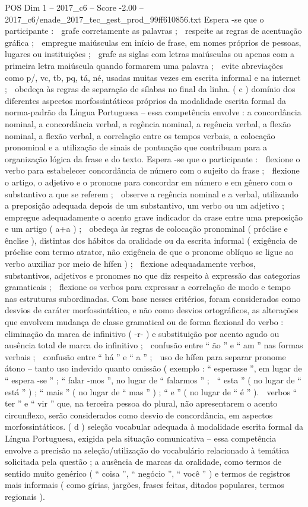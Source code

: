 \begin{textsample}{POS Dim 1 – 2017\_c6 – Score -2.00 – 2017\_c6/enade\_2017\_tec\_gest\_prod\_99ff610856.txt}
Espera -se que o participante :  grafe corretamente as palavras ;  respeite as regras de acentuação gráfica ;  empregue maiúsculas em início de frase, em nomes próprios de pessoas, lugares ou instituições ;  grafe as siglas com letras maiúsculas ou apenas com a primeira letra maiúscula quando formarem uma palavra ;  evite abreviações como p/, vc, tb, pq, tá, né, usadas muitas vezes em escrita informal e na internet ;  obedeça às regras de separação de sílabas no final da linha. ( c ) domínio dos diferentes aspectos morfossintáticos próprios da modalidade escrita formal da norma-padrão da Língua Portuguesa – essa competência envolve : a concordância nominal, a concordância verbal, a regência nominal, a regência verbal, a flexão nominal, a flexão verbal, a correlação entre os tempos verbais, a colocação pronominal e a utilização de sinais de pontuação que contribuam para a organização lógica da frase e do texto.
Espera -se que o participante :  flexione o verbo para estabelecer concordância de número com o sujeito da frase ;  flexione o artigo, o adjetivo e o pronome para concordar em número e em gênero com o substantivo a que se referem ;  observe a regência nominal e a verbal, utilizando a preposição adequada depois de um substantivo, um verbo ou um adjetivo ;  empregue adequadamente o acento grave indicador da crase entre uma preposição e um artigo ( a+a ) ;  obedeça às regras de colocação pronominal ( próclise e ênclise ), distintas dos hábitos da oralidade ou da escrita informal ( exigência de próclise com termo atrator, não exigência de que o pronome oblíquo se ligue ao verbo auxiliar por meio de hífen ) ;  flexione adequadamente verbos, substantivos, adjetivos e pronomes no que diz respeito à expressão das categorias gramaticais ;  flexione os verbos para expressar a correlação de modo e tempo nas estruturas subordinadas.
Com base nesses critérios, foram considerados como desvios de caráter morfossintático, e não como desvios ortográficos, as alterações que envolvem mudança de classe gramatical ou de forma flexional do verbo :  eliminação da marca de infinitivo ( -r- ) e substituição por acento agudo ou ausência total de marca do infinitivo ;  confusão entre “ ão ” e “ am ” nas formas verbais ;  confusão entre “ há ” e “ a ” ;  uso de hífen para separar pronome átono – tanto uso indevido quanto omissão ( exemplo : “ esperasse ”, em lugar de “ espera -se ” ; “ falar -mos ”, no lugar de “ falarmos ” ;  “ esta ” ( no lugar de “ está ” ) ; “ mais ” ( no lugar de “ mas ” ) ; “ e ” ( no lugar de “ é ” ).  verbos “ ter ” e “ vir ” que, na terceira pessoa do plural, não apresentarem o acento circunflexo, serão considerados como desvio de concordância, em aspectos morfossintáticos. ( d ) seleção vocabular adequada à modalidade escrita formal da Língua Portuguesa, exigida pela situação comunicativa – essa competência envolve a precisão na seleção/utilização do vocabulário relacionado à temática solicitada pela questão ; a ausência de marcas da oralidade, como termos de sentido muito genérico ( “ coisa ”, “ negócio ”, “ você ” ) e termos de registros mais informais ( como gírias, jargões, frases feitas, ditados populares, termos regionais ).

\end{textsample}
